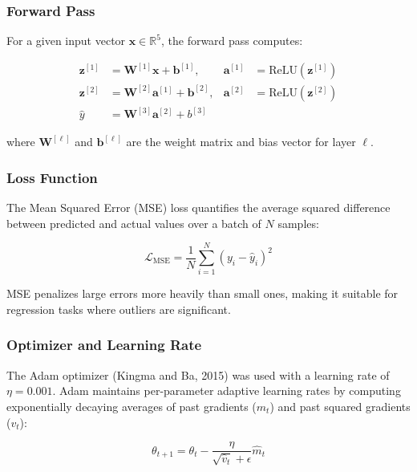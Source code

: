\documentclass[11pt, a4paper]{article}
\begin{document}
\subsubsection{Forward Pass}

For a given input vector $\mathbf{x} \in \mathbb{R}^5$, the forward pass
computes:

\begin{align}
\mathbf{z}^{[1]} &= \mathbf{W}^{[1]} \mathbf{x} + \mathbf{b}^{[1]}, &
\mathbf{a}^{[1]} &= \text{ReLU}(\mathbf{z}^{[1]}) \label{eq:forward1}\\
\mathbf{z}^{[2]} &= \mathbf{W}^{[2]} \mathbf{a}^{[1]} + \mathbf{b}^{[2]}, &
\mathbf{a}^{[2]} &= \text{ReLU}(\mathbf{z}^{[2]}) \label{eq:forward2}\\
\hat{y} &= \mathbf{W}^{[3]} \mathbf{a}^{[2]} + b^{[3]} \label{eq:forward3}
\end{align}

where $\mathbf{W}^{[\ell]}$ and $\mathbf{b}^{[\ell]}$ are the weight matrix
and bias vector for layer $\ell$.

\subsubsection{Loss Function}

The Mean Squared Error (MSE) loss quantifies the average squared difference
between predicted and actual values over a batch of $N$ samples:

\begin{equation}\label{eq:loss}
\mathcal{L}_{\text{MSE}} = \frac{1}{N} \sum_{i=1}^{N} \left(y_i - \hat{y}_i\right)^2
\end{equation}

MSE penalizes large errors more heavily than small ones, making it suitable
for regression tasks where outliers are significant.

\subsubsection{Optimizer and Learning Rate}

The Adam optimizer (Kingma and Ba, 2015) was used with a learning rate of
$\eta = 0.001$. Adam maintains per-parameter adaptive learning rates by
computing exponentially decaying averages of past gradients ($m_t$) and past
squared gradients ($v_t$):

\begin{equation}\label{eq:adam}
\theta_{t+1} = \theta_t - \frac{\eta}{\sqrt{\hat{v}_t} + \epsilon} \hat{m}_t
\end{equation}
\end{document}
